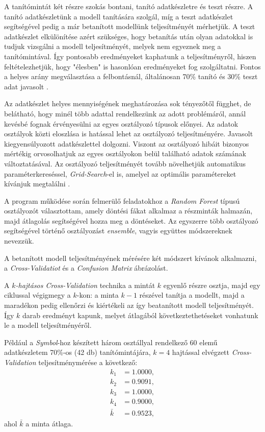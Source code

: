A tanítómintát két részre szokás bontani, tanító adatkészletre és teszt részre. A tanító adatkészletünk a modell tanítására szolgál, míg a teszt adatkészlet segítségével pedig a már betanított modellünk teljesítményét mérhetjük. A teszt adatkészlet elkülönítése azért szükséges, hogy betanítás után olyan adatokkal is tudjuk vizsgálni a modell teljesítményét, melyek nem egyeznek meg a tanítómintával. Így pontosabb eredményeket kaphatunk a teljesítményről, hiszen feltételezhetjük, hogy "élesben" is hasonlóan eredményeket fog szolgáltatni. Fontos a helyes arány megválasztása a felbontásnál, általánosan 70\% tanító és 30\% teszt adat javasolt \cite{geron2019hands}.

Az adatkészlet helyes mennyiségének meghatározása sok tényezőtől függhet, de belátható, hogy minél több adattal rendelkezünk az adott problémáról, annál kevésbé fognak érvényesülni az egyes osztályozó típusok előnyei. Az adatok osztályok közti eloszlása is hatással lehet az osztályozó teljesítményére. Javasolt kiegyensúlyozott adatkészlettel dolgozni. Viszont az osztályozó hibáit bizonyos mértékig orvosolhatjuk az egyes osztályokon belül található adatok számának változtatásával. Az osztályozó teljesítményét tovább növelhetjük automatikus paraméterkereséssel, \textit{Grid-Search}-el is, amelyel az optimális paramétereket kívánjuk megtalálni \cite{koesmarno2019class}.

A program működése során felmerülő feladatokhoz a \textit{Random Forest} típusú osztályozót választottam, amely döntési fákat alkalmaz a részminták halmazán, majd átlagolás segítségével hozza meg a döntéseket. Az egyszerre több osztályozó segítségével történő osztályozást \textit{ensemble}, vagyis együttes módszereknek nevezzük.

A betanított modell teljesítményének mérésére két módszert kívánok alkalmazni, a \textit{Cross-Validatiot} és a \textit{Confusion Matrix} ábrázolást.


A \textit{$k$-hajtásos Cross-Validation} technika a mintát $k$ egyenlő részre osztja, majd egy ciklussal végigmegy a $k$-kon: a minta $k-1$ részével tanítja a modellt, majd a maradékon pedig ellenőrzi és kiértékeli az így beatanított modell teljesítményét. Így $k$ darab eredményt kapunk, melyet átlagából következtethetéseket vonhatunk le a modell teljesítményéről.

Például a \textit{Symbol}-hoz készített három osztállyal rendelkező 60 elemű adatkészletem 70\%-os (42 db) tanítómintájára, $k=4$ hajtással elvégzett \textit{Cross-Validation} teljesítménymérése a következő:
\begin{align*}
	k_1 &= 1.0000, \\
	k_2 &= 0.9091, \\
	k_3 &= 1.0000, \\
	k_4 &= 0.9000, \\
	\bar{k} &= 0.9523,
\end{align*}
ahol $\bar{k}$ a minta átlaga.

